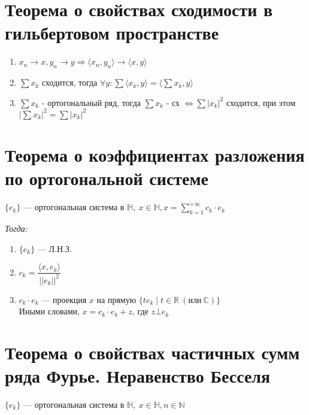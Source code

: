 \documentclass[paper=a4, fontsize=14pt]{report}
\begin{document}
    \section{Теорема о свойствах сходимости в гильбертовом пространстве}
    \begin{enumerate}
        \item $x_n \rightarrow x, y_n \rightarrow y \Rightarrow \langle x_n, y_n \rangle \rightarrow \langle x, y \rangle$

        \item $\sum x_k$ сходится, тогда $\forall y: \sum \langle x_k, y \rangle = \langle \sum x_k, y \rangle$

        \item $\sum x_k$ - ортогональный ряд, тогда $\sum x_k$ - сх $\Leftrightarrow \sum |x_k|^2$ сходится, при этом $|\sum x_k|^2 = \sum |x_k|^2$

    \end{enumerate}

    \section{Теорема о коэффициентах разложения по ортогональной системе}

    $\{e_k\}$ {{---}} ортогональная система в $\mathds{H},\ x \in \mathds{H}, x = \sum\limits_{k=1}^{+\infty} c_k \cdot e_k$

    \emph{Тогда:}
    \begin{enumerate}

        \item $\{e_k\}$ {{---}} Л.Н.З.

        \item $c_k = \dfrac{\langle x, e_k \rangle}{||e_k||^2}$

        \item $c_k \cdot e_k$ {{---}} проекция $x$ на прямую $\{te_k \mid t \in \mathbb{R}\ (\text{или}\ \mathbb{C})\}$\\
        Иными словами, $x = c_k \cdot e_k + z$, где $z \bot e_k$

    \end{enumerate}

    \section{Теорема о свойствах частичных сумм ряда Фурье. Неравенство Бесселя}

    $\{e_k\}$ {{---}} ортогональная система в $\mathds{H},\ x \in \mathds{H}, n \in \mathbb{N}$
\end{document}
